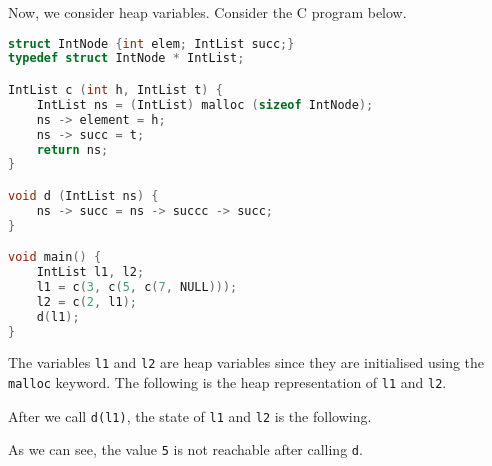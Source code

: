 \documentclass[a4paper, openany]{memoir}
\begin{document}
Now, we consider heap variables. Consider the C program below.
\begin{lstlisting}[language=C]
struct IntNode {int elem; IntList succ;}
typedef struct IntNode * IntList;

IntList c (int h, IntList t) {
    IntList ns = (IntList) malloc (sizeof IntNode);
    ns -> element = h;
    ns -> succ = t;
    return ns;
}

void d (IntList ns) {
    ns -> succ = ns -> succc -> succ;
}

void main() {
    IntList l1, l2;
    l1 = c(3, c(5, c(7, NULL)));
    l2 = c(2, l1);
    d(l1);
}
\end{lstlisting}
The variables \texttt{l1} and \texttt{l2} are heap variables since they are initialised using the \texttt{malloc} keyword. The following is the heap representation of \texttt{l1} and \texttt{l2}.
\begin{figure}[H]
    \centering
\end{figure}
\noindent After we call \texttt{d(l1)}, the state of \texttt{l1} and \texttt{l2} is the following.
\begin{figure}[H]
    \centering
\end{figure}
\noindent As we can see, the value \texttt{5} is not reachable after calling \texttt{d}. 
\end{document}
